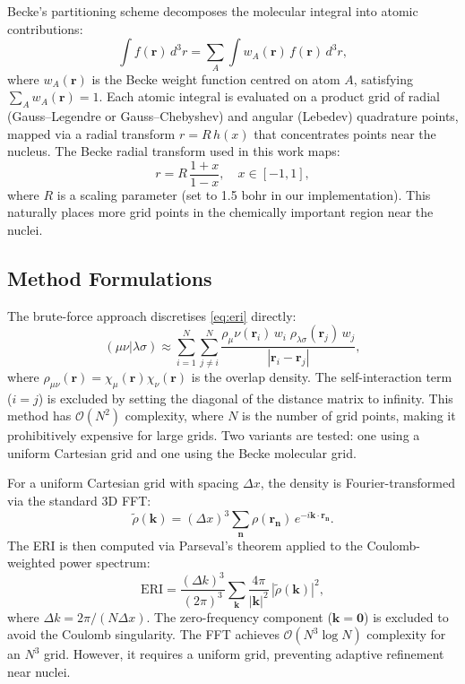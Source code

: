 \documentclass[12pt,a4paper]{article}
\begin{document}
\label{sec:becke}

Becke's partitioning scheme \cite{becke1988} decomposes the molecular integral into atomic contributions:
\begin{equation}
    \int f(\mathbf{r})\,d^3r = \sum_A \int w_A(\mathbf{r})\,f(\mathbf{r})\,d^3r,
    \label{eq:becke_partition}
\end{equation}
where $w_A(\mathbf{r})$ is the Becke weight function centred on atom $A$, satisfying $\sum_A w_A(\mathbf{r}) = 1$. Each atomic integral is evaluated on a product grid of radial (Gauss--Legendre or Gauss--Chebyshev) and angular (Lebedev) quadrature points, mapped via a radial transform $r = R\,h(x)$ that concentrates points near the nucleus. The Becke radial transform used in this work maps:
\begin{equation}
 r = R\,\frac{1 + x}{1 - x}, \quad x \in [-1, 1],
    \label{eq:becke_rtransform}
\end{equation}
where $R$ is a scaling parameter (set to 1.5 bohr in our implementation). This naturally places more grid points in the chemically important region near the nuclei.

\subsection{Method Formulations}

The brute-force approach discretises \eqref{eq:eri} directly:
\begin{equation}
 (\mu\nu|\lambda\sigma) \approx \sum_{i=1}^{N}\sum_{j \neq i}^{N} \frac{\rho_\mu\nu(\mathbf{r}_i)\,w_i\;\rho_{\lambda\sigma}(\mathbf{r}_j)\,w_j}{|\mathbf{r}_i - \mathbf{r}_j|},
    \label{eq:direct}
\end{equation}
where $\rho_{\mu\nu}(\mathbf{r}) = \chi_\mu(\mathbf{r})\chi_\nu(\mathbf{r})$ is the overlap density. The self-interaction term ($i = j$) is excluded by setting the diagonal of the distance matrix to infinity. This method has $\mathcal{O}(N^2)$ complexity, where $N$ is the number of grid points, making it prohibitively expensive for large grids. Two variants are tested: one using a uniform Cartesian grid and one using the Becke molecular grid.

For a uniform Cartesian grid with spacing $\Delta x$, the density is Fourier-transformed via the standard 3D FFT:
\begin{equation}
 \widetilde{\rho}(\mathbf{k}) = (\Delta x)^3 \sum_{\mathbf{n}} \rho(\mathbf{r}_\mathbf{n})\,e^{-i\mathbf{k}\cdot\mathbf{r}_\mathbf{n}}.
    \label{eq:fft_forward}
\end{equation}
The ERI is then computed via Parseval's theorem applied to the Coulomb-weighted power spectrum:
\begin{equation}
 \text{ERI} = \frac{(\Delta k)^3}{(2\pi)^3}\sum_{\mathbf{k}} \frac{4\pi}{|\mathbf{k}|^2}\,|\widetilde{\rho}(\mathbf{k})|^2,
    \label{eq:fft_eri}
\end{equation}
where $\Delta k = 2\pi/(N\Delta x)$. The zero-frequency component ($\mathbf{k} = \mathbf{0}$) is excluded to avoid the Coulomb singularity. The FFT achieves $\mathcal{O}(N^3\log N)$ complexity for an $N^3$ grid. However, it requires a uniform grid, preventing adaptive refinement near nuclei.
\end{document}
